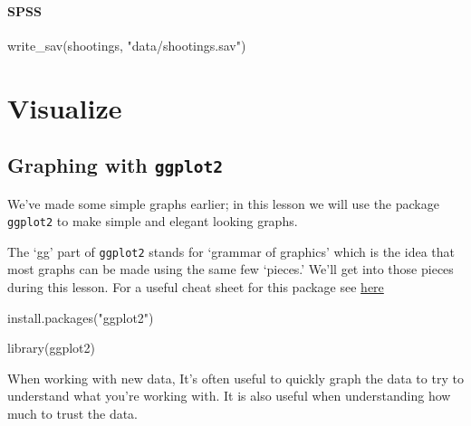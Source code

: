 \documentclass[
  12pt,
  openany]{book}
\newenvironment{Shaded}{\begin{snugshade}}{\end{snugshade}}
\newcommand{\FunctionTok}[1]{\textcolor[rgb]{0,0,0}{#1}}
\newcommand{\NormalTok}[1]{#1}
\newcommand{\StringTok}[1]{\textcolor[rgb]{0.5,0.5,0.5}{#1}}
\begin{document}
\hypertarget{spss-1}{%
\subsection{SPSS}\label{spss-1}}

\begin{Shaded}
\begin{Highlighting}[]
\FunctionTok{write\_sav}\NormalTok{(shootings, }\StringTok{"data/shootings.sav"}\NormalTok{)}
\end{Highlighting}
\end{Shaded}

\hypertarget{part-visualize}{%
\part{Visualize}\label{part-visualize}}

\hypertarget{graphing-intro}{%
\chapter{\texorpdfstring{Graphing with \texttt{ggplot2}}{Graphing with ggplot2}}\label{graphing-intro}}

We've made some simple graphs earlier; in this lesson we will use the package \texttt{ggplot2} to make simple and elegant looking graphs.

The `gg' part of \texttt{ggplot2} stands for `grammar of graphics' which is the idea that most graphs can be made using the same few `pieces.' We'll get into those pieces during this lesson. For a useful cheat sheet for this package see \href{https://www.rstudio.com/wp-content/uploads/2015/03/ggplot2-cheatsheet.pdf}{here}

\begin{Shaded}
\begin{Highlighting}[]
\FunctionTok{install.packages}\NormalTok{(}\StringTok{"ggplot2"}\NormalTok{)}
\end{Highlighting}
\end{Shaded}

\begin{Shaded}
\begin{Highlighting}[]
\FunctionTok{library}\NormalTok{(ggplot2)}
\end{Highlighting}
\end{Shaded}

When working with new data, It's often useful to quickly graph the data to try to understand what you're working with. It is also useful when understanding how much to trust the data.
\end{document}

